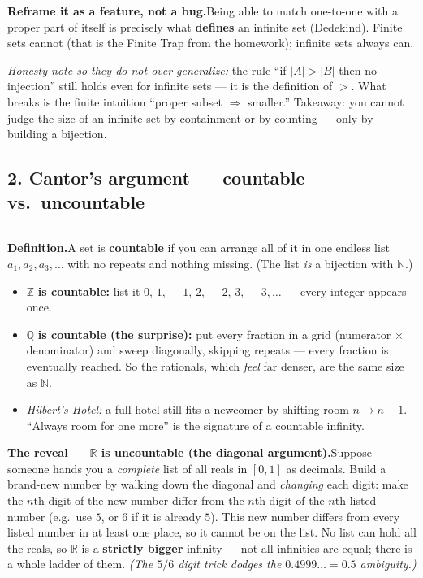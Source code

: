 \documentclass[12pt]{article}
\begin{document}
\textbf{Reframe it as a feature, not a bug.}\quad Being able to match one-to-one with a proper part of itself is precisely what \textbf{defines} an infinite set (Dedekind). Finite sets cannot (that is the Finite Trap from the homework); infinite sets always can.

\textit{Honesty note so they do not over-generalize:} the rule ``if $|A| > |B|$ then no injection'' still holds even for infinite sets --- it is the definition of $>$. What breaks is the finite intuition ``proper subset $\Rightarrow$ smaller.'' Takeaway: you cannot judge the size of an infinite set by containment or by counting --- only by building a bijection.

\bigskip
\subsection*{2. Cantor's argument --- countable vs.\ uncountable}
\hrule
\textbf{Definition.}\quad A set is \textbf{countable} if you can arrange all of it in one endless list $a_1, a_2, a_3, \ldots$ with no repeats and nothing missing. (The list \emph{is} a bijection with $\mathbb{N}$.)

\begin{itemize}
  \item $\mathbb{Z}$ \textbf{is countable:} list it $0,\,1,\,-1,\,2,\,-2,\,3,\,-3,\ldots$ --- every integer appears once.
  \item $\mathbb{Q}$ \textbf{is countable (the surprise):} put every fraction in a grid (numerator $\times$ denominator) and sweep diagonally, skipping repeats --- every fraction is eventually reached. So the rationals, which \emph{feel} far denser, are the same size as $\mathbb{N}$.
  \item \textit{Hilbert's Hotel:} a full hotel still fits a newcomer by shifting room $n \to n+1$. ``Always room for one more'' is the signature of a countable infinity.
\end{itemize}

\textbf{The reveal --- $\mathbb{R}$ is uncountable (the diagonal argument).}\quad Suppose someone hands you a \emph{complete} list of all reals in $[0,1]$ as decimals. Build a brand-new number by walking down the diagonal and \emph{changing} each digit: make the $n$th digit of the new number differ from the $n$th digit of the $n$th listed number (e.g.\ use $5$, or $6$ if it is already $5$). This new number differs from every listed number in at least one place, so it cannot be on the list. No list can hold all the reals, so $\mathbb{R}$ is a \textbf{strictly bigger} infinity --- not all infinities are equal; there is a whole ladder of them. \textit{(The $5/6$ digit trick dodges the $0.4999\ldots = 0.5$ ambiguity.)}
\end{document}
